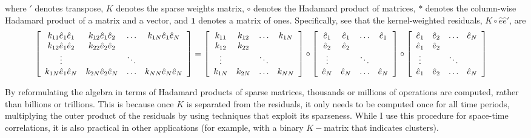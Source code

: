 where $'$ denotes transpose, $K$ denotes the sparse weights matrix, $\circ$ denotes the Hadamard product of matrices, $*$ denotes the column-wise Hadamard product of a matrix and a vector, and $\mathbf{1}$ denotes a matrix of ones. Specifically, see that the kernel-weighted residuals, $K \circ \hat{e} \hat{e}'$, are 
\begin{eqnarray*}
\hspace*{-1em}
\left[\begin{array}{cccc}
k_{11}\hat{e}_{1}\hat{e}_{1} & k_{12}\hat{e}_{1}\hat{e}_{2} & \hdots & k_{1N}\hat{e}_{1}\hat{e}_{N}  \\
k_{12}\hat{e}_{1}\hat{e}_{2} & k_{22}\hat{e}_{2}\hat{e}_{2} &	     & 		     					\\
\vdots						 &   				  			& \ddots &  	        					\\
k_{1N}\hat{e}_{1}\hat{e}_{N} & k_{2N}\hat{e}_{2}\hat{e}_{N} & \hdots & k_{NN}\hat{e}_{N}\hat{e}_{N}
\end{array}\right] 
=
\left[\begin{array}{cccc}
k_{11} & k_{12} & \hdots  & k_{1N}  \\
k_{12} & k_{22} & 	      & 		\\
\vdots	&   	& \ddots  &	 	\\
k_{1N} & k_{2N} & \hdots  & k_{NN}
\end{array}\right]
\circ
\left[\begin{array}{cccc}
\hat{e}_{1} & \hat{e}_{1} & \hdots  & \hat{e}_{1}  \\
\hat{e}_{2} & \hat{e}_{2} & 	    & 		       \\
\vdots		&   		  & \ddots  &  	           \\
\hat{e}_{N} & \hat{e}_{N} & \hdots  & \hat{e}_{N}
\end{array}\right]
\circ
\left[\begin{array}{cccc}
\hat{e}_{1} & \hat{e}_{2} & \hdots  & \hat{e}_{N} \\
\hat{e}_{1} & \hat{e}_{2} & 	    &			  \\
\vdots      &			  & \ddots  &			  \\
\hat{e}_{1} & \hat{e}_{2} & \hdots  & \hat{e}_{N}
\end{array}\right]
\end{eqnarray*}


By reformulating the algebra in terms of Hadamard products of sparse matrices, thousands or millions of operations are computed, rather than billions or trillions. This is because once $K$ is separated from the residuals, it only needs to be computed once for all time periods, multiplying the outer product of the residuals by using techniques that exploit its sparseness. While I use this procedure for space-time correlations, it is also practical in other applications (for example, with a binary $K-$matrix that indicates clusters).


